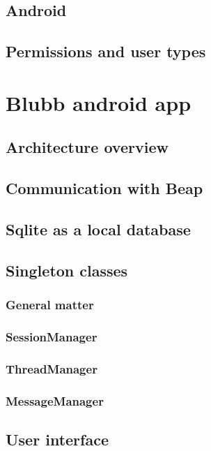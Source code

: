 \documentclass[11pt,a4paper,oneside]{report}
\begin{document}
\section{Android}

\section{Permissions and user types}

\chapter{Blubb android app}

\section{Architecture overview}

\section{Communication with Beap}

\section{Sqlite as a local database}

\section{Singleton classes}

\subsection{General matter}

\subsection{SessionManager}

\subsection{ThreadManager}

\subsection{MessageManager}

\section{User interface}
\end{document}
